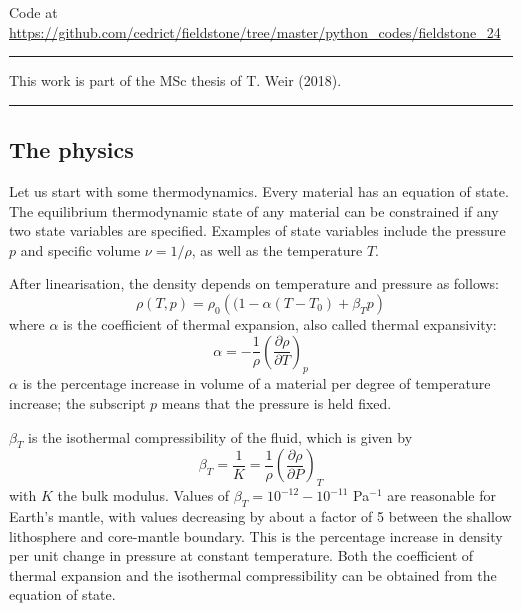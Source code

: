

\begin{center}
Code at \url{https://github.com/cedrict/fieldstone/tree/master/python_codes/fieldstone_24}
\end{center}

\par\noindent\rule{\textwidth}{0.4pt}

This work is part of the MSc thesis of T. Weir (2018).

\par\noindent\rule{\textwidth}{0.4pt}

\Literature \cite{itki94,tagu07,lezh08,kilv10,lezh11,lizh13,hedg17,civj17}

\subsection*{The physics}

Let us start with some thermodynamics. Every material has an equation of state.
The equilibrium thermodynamic state of any material can
be constrained if any two state variables are specified.
Examples of state variables include
the pressure $p$ and specific volume $\nu = 1/\rho$, as well as the temperature $T$.

After linearisation, the density depends on temperature and pressure as follows:
\[
\rho(T,p) = \rho_0 \left((1 - \alpha(T-T_0) + \beta_T p \right)
\]
where $\alpha$ is the coefficient of thermal expansion, also called 
thermal expansivity: 
\[
\alpha=-\frac{1}{\rho}\left( \frac{\partial \rho}{\partial T} \right)_p
\]
$\alpha$ is the percentage increase in volume of a material per degree of temperature increase; the
subscript $p$ means that the pressure is held fixed.

$\beta_T$ is the isothermal compressibility of the fluid, which is given by 
\[
\beta_T = \frac{1}{K} = \frac{1}{\rho}\left( \frac{\partial \rho}{\partial P} \right)_T
\]
with $K$ the bulk modulus. 
Values of $\beta_T=10^{-12}-10^{-11}$ Pa$^{-1}$ are reasonable for Earth's mantle, with values decreasing by about a
factor of 5 between the shallow lithosphere and core-mantle boundary.
This is the percentage increase in density per unit change in pressure at constant temperature.
Both the coefficient of thermal expansion and the isothermal compressibility can be obtained
from the equation of state.


